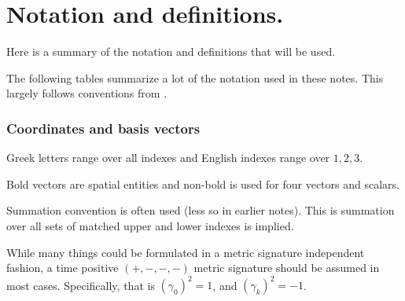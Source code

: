 \chapter{Notation and definitions.}\label{chap:notationTable}

Here is a summary of the notation and definitions that will be used.

The following tables summarize a lot of the notation used in these notes.
This largely follows conventions from \cite{doran2003gap}.

\subsection{Coordinates and basis vectors}

Greek letters range over all indexes and English indexes range over $1,2,3$.

Bold vectors are spatial entities and non-bold is used for four vectors and scalars.

Summation convention is often used (less so in earlier notes).  This is 
summation over all sets of matched upper and lower indexes is implied.

While many things could be formulated in a metric signature independent
fashion, 
a time positive
$(+,-,-,-)$
metric signature should be assumed in most cases.  Specifically, that is $(\gamma_0)^2 = 1$, and $(\gamma_k)^2 = -1$.

